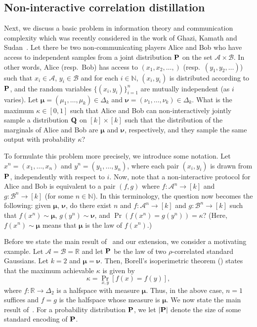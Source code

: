 \documentclass{toc}
\newcommand{\bP}{{\bf P}}
\newcommand{\bQ}{{\bf Q}}
\begin{document}
\subsection{Non-interactive correlation distillation}
Next, we discuss a basic problem in information theory and communication
complexity which was recently considered in the work of Ghazi, Kamath and
Sudan~\cite{GKS:16}.  Let there be two non-communicating players Alice and Bob
who have access to independent samples from a joint distribution $\bP$ on the set $\mathcal{A} \times \mathcal{B}$. In other words, Alice
(resp.\ Bob) has access to $(x_1, x_2, \ldots, )$ (resp.\ $(y_1, y_2, \ldots)$)
such that $x_i \in \mathcal{A}$, $y_i \in \mathcal{B}$ and for each $i \in
\mathbb{N}$, $(x_i, y_i)$ is distributed according to $\bP$, and the random
variables $\{(x_i, y_i)\}_{i=1}^n$ are mutually independent (as $i$ varies).
Let $\boldsymbol{\mu} = (\mu_1, \ldots, \mu_k) \in \Delta_k$ and
$\boldsymbol{\nu} = (\nu_1, \ldots, \nu_k) \in \Delta_k$.  What is the maximum
$\kappa \in [0,1]$ such that Alice and Bob can non-interactively jointly sample
a distribution $\bQ$ on $[k] \times [k]$ such that the distribution of the
marginals of Alice and Bob are $\boldsymbol{\mu}$ and $\boldsymbol{\nu}$,
%
respectively, and they sample the same output with probability $\kappa$? 

To formulate this problem more precisely, we introduce some notation.  Let $x^n
= (x_1, \dots, x_n)$ and $y^n = (y_1, \dots, y_n)$, where each pair $(x_i,
y_i)$ is drawn from $\bP$, independently with respect to $i$.  Now, note that a
non-interactive protocol for Alice and Bob is equivalent to a pair $(f,g)$
where 
$f: \mathcal{A}^n \rightarrow [k]$ and $g: \mathcal{B}^n \rightarrow [k]$ (for some $n \in \mathbb{N}$). 
In this terminology, the question now becomes the following: given
$\boldsymbol{\mu}$, $\boldsymbol{\nu}$, do there exist $n$ and $f:
\mathcal{A}^n \rightarrow [k]$ and $g: \mathcal{B}^n \rightarrow [k]$ such that
$f(x^n) \sim \boldsymbol{\mu}$,
$g(y^n) \sim \boldsymbol{\nu}$, and
$\Pr(f(x^n) = g(y^n)) = \kappa$?
(Here, $f(x^n) \sim \boldsymbol{\mu}$ means that $\boldsymbol{\mu}$ is the law
of $f(x^n)$.)

Before we state the main result of~\cite{GKS:16} and our extension, we consider
a motivating example. Let $\mathcal{A}= \mathcal{B}= \mathbb{R}$ and let $\bP$ be
the law of two $\rho$-correlated standard Gaussians. Let $k=2$ and
$\boldsymbol{\mu} = \boldsymbol{\nu}$.  Then, Borell's isoperimetric theorem
()
states that the maximum achievable $\kappa$ is given by 
\[
\kappa = \Pr_{x,y}[f(x) = f(y)],
\]
where $f : \mathbb{R} \rightarrow \Delta_2$ is a halfspace with measure $\boldsymbol{\mu}$. Thus, in the above case, $n=1$ suffices and $f=g$ is the halfspace whose measure is $\boldsymbol{\mu}$. We now state the main result of~\cite{GKS:16}. For a probability distribution $\bP$, we let $|\bP|$ denote the size of some standard encoding of $\bP$. 
\end{document}
